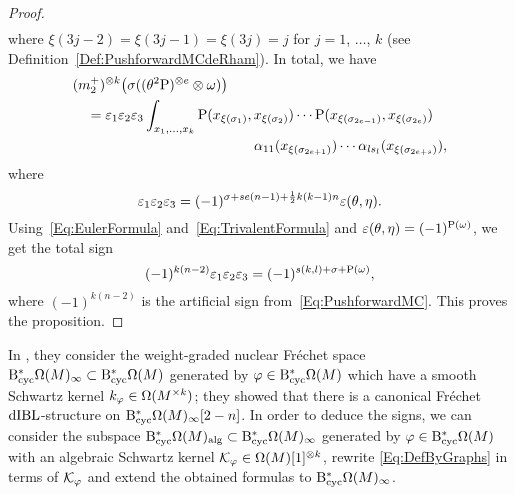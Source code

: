 \documentclass[\MainFolder/Text.tex]{subfiles}
\begin{document}
\begin{proof}
\begin{align*}
\end{align*}
where $\xi(3j-2) = \xi(3j-1) = \xi(3j) = j$ for $j=1$, $\dotsc$, $k$ (see Definition~\ref{Def:PushforwardMCdeRham}). In total, we have 
\begin{align*} &(m_2^+)^{\otimes k} \bigl(\sigma((\SuspU^{ 2} \Prpg)^{\otimes e} \otimes \omega)\bigr) \\ 
&\quad = \begin{multlined}[t]\varepsilon_1 \varepsilon_2 \varepsilon_3  \int_{x_1,\dotsc,x_k} \Prpg(x_{\xi(\sigma_1)},x_{\xi(\sigma_2)}) \dotsm  \Prpg(x_{\xi(\sigma_{2e-1})},x_{\xi(\sigma_{2e})}) \\ \alpha_{11}(x_{\xi(\sigma_{2e+1})}) \dotsm \alpha_{ls_{l}}(x_{\xi(\sigma_{2e+s})}),\end{multlined}
\end{align*}
where
\[ \varepsilon_1 \varepsilon_2 \varepsilon_3 = (-1)^{\sigma + s e (n-1)+ \frac{1}{2}k(k-1)n} \varepsilon(\theta,\eta). \]
Using~\eqref{Eq:EulerFormula} and~\eqref{Eq:TrivalentFormula} and $\varepsilon(\theta,\eta) = (-1)^{\mathrm{P}(\omega)}$, we get the total sign
\[ (-1)^{k(n-2)}\varepsilon_1 \varepsilon_2 \varepsilon_3  = (-1)^{s(k,l) + \sigma + \mathrm{P}(\omega)},  \]
where $(-1)^{k(n-2)}$ is the artificial sign from~\eqref{Eq:PushforwardMC}. This proves the proposition.
\end{proof}


\begin{Remark}\label{Rem:Frechet}
In \cite[Section~13]{Cieliebak2015}, they consider the weight-graded nuclear Fr\'echet space $\mathrm{B}_{\mathrm{cyc}}^* \Omega(M)_{\infty} \subset \mathrm{B}_{\mathrm{cyc}}^* \Omega(M)$ generated by $\varphi\in \mathrm{B}_{\mathrm{cyc}}^* \Omega(M)$ which have a smooth Schwartz kernel $k_\varphi\in \Omega(M^{\times k})$; they showed that there is a canonical Fr\'echet $\mathrm{dIBL}$-structure on $\mathrm{B}_{\mathrm{cyc}}^* \Omega(M)_{\infty}[2-n]$. In order to deduce the signs, we can consider the subspace $\mathrm{B}_{\mathrm{cyc}}^* \Omega(M)_{\mathrm{alg}} \subset \mathrm{B}_{\mathrm{cyc}}^* \Omega(M)_\infty$ generated by $\varphi\in \mathrm{B}_{\mathrm{cyc}}^* \Omega(M)$ with an algebraic Schwartz kernel $\mathcal{K}_\varphi \in \Omega(M)[1]^{\otimes k}$, rewrite \eqref{Eq:DefByGraphs} in terms of $\mathcal{K}_\varphi$ and extend the obtained formulas to $\mathrm{B}_{\mathrm{cyc}}^* \Omega(M)_\infty$.
\end{Remark}
\end{document}
